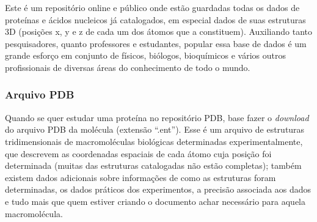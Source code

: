 \documentclass[a4paper,12pt]{article}
\begin{document}
	Este é um repositório online e público onde estão guardadas todas os dados de proteínas e ácidos nucleicos já catalogados, em especial dados de suas estruturas 3D (posições x, y e z de cada um dos átomos que a constituem). Auxiliando tanto pesquisadores, quanto professores e estudantes, popular essa base de dados é um grande esforço em conjunto de físicos, biólogos, bioquímicos e vários outros profissionais de diversas áreas do conhecimento de todo o mundo.
	
	\subsubsection*{Arquivo PDB}
	Quando se quer estudar uma proteína no repositório PDB, base fazer o \textit{download} do arquivo PDB da molécula (extensão ``.ent''). Esse é um arquivo de estruturas tridimensionais de macromoléculas biológicas determinadas experimentalmente, que descrevem as coordenadas espaciais de cada átomo cuja posição foi determinada (muitas das estruturas catalogadas não estão completas); também existem dados adicionais sobre informações de como as estruturas foram determinadas, os dados práticos dos experimentos, a precisão associada aos dados e tudo mais que quem estiver criando o documento achar necessário para aquela macromolécula.
	
\end{document}
